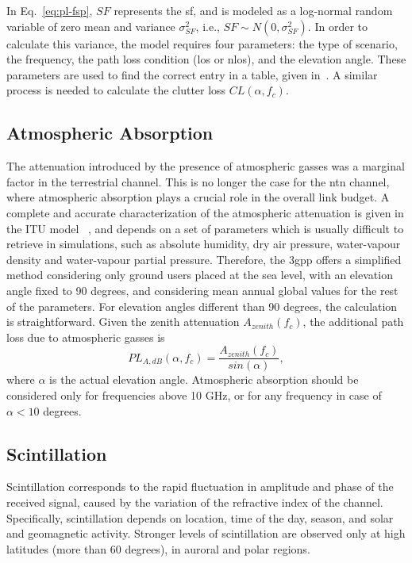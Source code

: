 In Eq.~\eqref{eq:pl-fsp}, $SF$ represents the \gls{sf}, and is modeled as a log-normal random variable of zero mean and variance $\sigma_{SF}^2$, i.e., $SF \sim N\left ( 0,\sigma_{SF}^{2} \right )$. In order to calculate this variance, the model requires four parameters: the type of scenario, the frequency, the path loss condition (\gls{los} or \gls{nlos}), and the elevation angle. These parameters are used to find the correct entry in a table, given in~\cite{38811}.
A similar process is needed to calculate the clutter loss $CL(\alpha,f_{c})$.


\subsection{Atmospheric Absorption}
\label{sub:atm}
The attenuation introduced by the presence of atmospheric gasses was a marginal factor in the terrestrial channel.
This is no longer the case for the \gls{ntn} channel, where atmospheric absorption plays a crucial role in the overall link budget. 
A complete and accurate characterization of the atmospheric attenuation is given in the ITU model~ \cite{itup676}, and depends on a set of parameters which is usually difficult to retrieve in simulations, such as absolute humidity, dry air pressure, water-vapour density and water-vapour partial pressure. 
Therefore, the \gls{3gpp} offers a simplified method considering only ground users placed at the sea level, with an elevation angle fixed to 90 degrees, and considering mean annual global values for the rest of the parameters. 
For elevation angles different than 90 degrees, the calculation is straightforward. Given the zenith attenuation $A_{zenith}(f_{c})$, the additional path loss due to atmospheric gasses is
\begin{equation}
    PL_{A,dB}\left ( \alpha,f_{c} \right )=\frac{A_{zenith}\left ( f_{c} \right ) }{sin(\alpha)},
\end{equation}
where $\alpha$ is the actual elevation angle.
Atmospheric absorption should be considered only for frequencies above 10 GHz, or for any frequency in case of $\alpha<10$ degrees.

\subsection{Scintillation}
Scintillation corresponds to the rapid fluctuation in amplitude and phase of the received signal, caused by the variation of the refractive index of the channel. 
Specifically, scintillation depends on location, time of the day, season, and solar and geomagnetic activity. Stronger levels of scintillation are observed only at high latitudes  (more than 60 degrees), in auroral and polar regions. 


